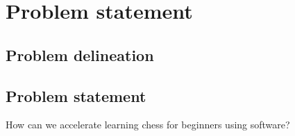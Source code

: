 \chapter{Problem statement}\label{ch:problem-statement}

\section{Problem delineation}\label{sec:problem-delineation}

\section{Problem statement}\label{sec:problem-statement}

How can we accelerate learning chess for beginners using software?

